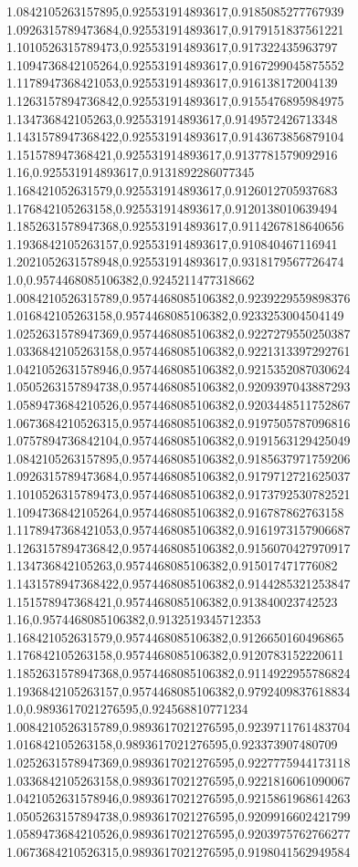 1.0842105263157895,0.925531914893617,0.9185085277767939
1.0926315789473684,0.925531914893617,0.9179151837561221
1.1010526315789473,0.925531914893617,0.917322435963797
1.1094736842105264,0.925531914893617,0.9167299045875552
1.1178947368421053,0.925531914893617,0.916138172004139
1.1263157894736842,0.925531914893617,0.9155476895984975
1.134736842105263,0.925531914893617,0.9149572426713348
1.1431578947368422,0.925531914893617,0.9143673856879104
1.151578947368421,0.925531914893617,0.9137781579092916
1.16,0.925531914893617,0.9131892286077345
1.168421052631579,0.925531914893617,0.9126012705937683
1.176842105263158,0.925531914893617,0.9120138010639494
1.1852631578947368,0.925531914893617,0.9114267818640656
1.1936842105263157,0.925531914893617,0.910840467116941
1.2021052631578948,0.925531914893617,0.9318179567726474
1.0,0.9574468085106382,0.9245211477318662
1.0084210526315789,0.9574468085106382,0.9239229559898376
1.016842105263158,0.9574468085106382,0.9233253004504149
1.0252631578947369,0.9574468085106382,0.9227279550250387
1.0336842105263158,0.9574468085106382,0.9221313397292761
1.0421052631578946,0.9574468085106382,0.9215352087030624
1.0505263157894738,0.9574468085106382,0.9209397043887293
1.0589473684210526,0.9574468085106382,0.9203448511752867
1.0673684210526315,0.9574468085106382,0.9197505787096816
1.0757894736842104,0.9574468085106382,0.9191563129425049
1.0842105263157895,0.9574468085106382,0.9185637971759206
1.0926315789473684,0.9574468085106382,0.9179712721625037
1.1010526315789473,0.9574468085106382,0.9173792530782521
1.1094736842105264,0.9574468085106382,0.916787862763158
1.1178947368421053,0.9574468085106382,0.9161973157906687
1.1263157894736842,0.9574468085106382,0.9156070427970917
1.134736842105263,0.9574468085106382,0.915017471776082
1.1431578947368422,0.9574468085106382,0.9144285321253847
1.151578947368421,0.9574468085106382,0.913840023742523
1.16,0.9574468085106382,0.9132519345712353
1.168421052631579,0.9574468085106382,0.9126650160496865
1.176842105263158,0.9574468085106382,0.9120783152220611
1.1852631578947368,0.9574468085106382,0.9114922955786824
1.1936842105263157,0.9574468085106382,0.9792409837618834
1.0,0.9893617021276595,0.924568810771234
1.0084210526315789,0.9893617021276595,0.9239711761483704
1.016842105263158,0.9893617021276595,0.923373907480709
1.0252631578947369,0.9893617021276595,0.9227775944173118
1.0336842105263158,0.9893617021276595,0.9221816061090067
1.0421052631578946,0.9893617021276595,0.9215861968614263
1.0505263157894738,0.9893617021276595,0.9209916602421799
1.0589473684210526,0.9893617021276595,0.9203975762766277
1.0673684210526315,0.9893617021276595,0.9198041562949584
